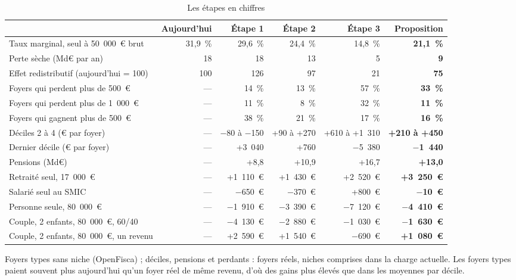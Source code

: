 \documentclass[11pt,a4paper]{article}
\begin{document}
\begin{table}[!htbp]\centering\scriptsize\setlength{\tabcolsep}{3pt}
\caption{Les étapes en chiffres}\label{tab:synth}
\begin{tabular}{@{}lrrrrr@{}}
\toprule
& Aujourd'hui & Étape 1 & Étape 2 & Étape 3 & \textbf{Proposition} \\
\midrule
Taux marginal, seul à 50~000~€ brut & 31,9~\% & 29,6~\% & 24,4~\% & 14,8~\% & \textbf{21,1~\%} \\
Perte sèche (Md€ par an) & 18 & 18 & 13 & 5 & \textbf{9} \\
Effet redistributif (aujourd'hui = 100) & 100 & 126 & 97 & 21 & \textbf{75} \\
\midrule
Foyers qui perdent plus de 500~€ & --- & 14~\% & 13~\% & 57~\% & \textbf{33~\%} \\
Foyers qui perdent plus de 1~000~€ & --- & 11~\% & 8~\% & 32~\% & \textbf{11~\%} \\
Foyers qui gagnent plus de 500~€ & --- & 38~\% & 21~\% & 17~\% & \textbf{16~\%} \\
\midrule
Déciles 2 à 4 (€ par foyer) & --- & $-$80 à $-$150 & +90 à +270 & +610 à +1~310 & \textbf{+210 à +450} \\
Dernier décile (€ par foyer) & --- & +3~040 & +760 & $-$5~380 & \textbf{$-$1~440} \\
Pensions (Md€) & --- & +8,8 & +10,9 & +16,7 & \textbf{+13,0} \\
Retraité seul, 17~000~€ & --- & +1~110~€ & +1~430~€ & +2~520~€ & \textbf{+3~250~€} \\
Salarié seul au SMIC & --- & $-$650~€ & $-$370~€ & +800~€ & \textbf{$-$10~€} \\
Personne seule, 80~000~€ & --- & $-$1~910~€ & $-$3~390~€ & $-$7~120~€ & \textbf{$-$4~410~€} \\
Couple, 2 enfants, 80~000~€, 60/40 & --- & $-$4~130~€ & $-$2~880~€ & $-$1~030~€ & \textbf{$-$1~630~€} \\
Couple, 2 enfants, 80~000~€, un revenu & --- & +2~590~€ & +1~540~€ & $-$690~€ & \textbf{+1~080~€} \\
\bottomrule
\end{tabular}
\par\vspace{3pt}\parbox{\linewidth}{\raggedright\scriptsize\color{encre} Foyers types sans niche (OpenFisca) ;
déciles, pensions et perdants : foyers réels, niches comprises dans la charge actuelle. Les foyers types
paient souvent plus aujourd'hui qu'un foyer réel de même revenu, d'où des gains plus élevés que dans les
moyennes par décile.}
\end{table}
\end{document}
